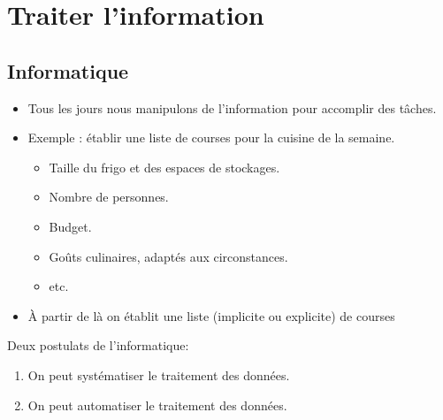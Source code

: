 \section[Traiter]{Traiter l'information}

\subsection{Informatique}

\begin{slide}
	\begin{itemize}
	\item Tous les jours nous manipulons de l'information pour accomplir des tâches.
	\item Exemple : établir une liste de courses pour la cuisine de la semaine.
		
		\begin{itemize}
			\item Taille du frigo et des espaces de stockages.
			\item Nombre de personnes.
			\item Budget.
			\item Goûts culinaires, adaptés aux circonstances.
			\item etc.
		\end{itemize}
	\item À partir de là on établit une liste (implicite ou explicite) de courses
	
	\end{itemize}
\end{slide}

\begin{slide}

Deux postulats de l'informatique:
	\begin{enumerate}
		\item On peut systématiser le traitement des données.
		\item On peut automatiser le traitement des données.
	\end{enumerate}
\end{slide}

